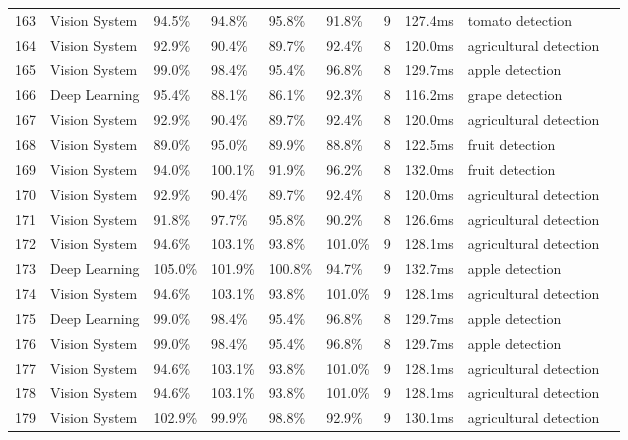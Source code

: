 \begin{table*}[htbp]
\begin{tabular}{p{}p{}p{}p{}p{}p{}p{}p{}p{}p{}}
 163 & Vision System & 94.5\% & 94.8\% & 95.8\% & 91.8\% & 9 & 127.4ms & tomato detection & \cite{jun2021towards} \\
 164 & Vision System & 92.9\% & 90.4\% & 89.7\% & 92.4\% & 8 & 120.0ms & agricultural detection & \cite{andujar2016using} \\
 165 & Vision System & 99.0\% & 98.4\% & 95.4\% & 96.8\% & 8 & 129.7ms & apple detection & \cite{hohimer2019design} \\
 166 & Deep Learning & 95.4\% & 88.1\% & 86.1\% & 92.3\% & 8 & 116.2ms & grape detection & \cite{pereira2019deep} \\
 167 & Vision System & 92.9\% & 90.4\% & 89.7\% & 92.4\% & 8 & 120.0ms & agricultural detection & \cite{bac2016analysis} \\
 168 & Vision System & 89.0\% & 95.0\% & 89.9\% & 88.8\% & 8 & 122.5ms & fruit detection & \cite{mehta2016robust} \\
 169 & Vision System & 94.0\% & 100.1\% & 91.9\% & 96.2\% & 8 & 132.0ms & fruit detection & \cite{williams2020improvements} \\
 170 & Vision System & 92.9\% & 90.4\% & 89.7\% & 92.4\% & 8 & 120.0ms & agricultural detection & \cite{lehnert2016sweet} \\
 171 & Vision System & 91.8\% & 97.7\% & 95.8\% & 90.2\% & 8 & 126.6ms & agricultural detection & \cite{ayaz2019internet} \\
 172 & Vision System & 94.6\% & 103.1\% & 93.8\% & 101.0\% & 9 & 128.1ms & agricultural detection & \cite{dutta2020cleaning} \\
 173 & Deep Learning & 105.0\% & 101.9\% & 100.8\% & 94.7\% & 9 & 132.7ms & apple detection & \cite{kang2020fast} \\
 174 & Vision System & 94.6\% & 103.1\% & 93.8\% & 101.0\% & 9 & 128.1ms & agricultural detection & \cite{khanal2020remote} \\
 175 & Deep Learning & 99.0\% & 98.4\% & 95.4\% & 96.8\% & 8 & 129.7ms & apple detection & \cite{gene2019multi} \\
 176 & Vision System & 99.0\% & 98.4\% & 95.4\% & 96.8\% & 8 & 129.7ms & apple detection & \cite{kang2019fruit} \\
 177 & Vision System & 94.6\% & 103.1\% & 93.8\% & 101.0\% & 9 & 128.1ms & agricultural detection & \cite{luo2020identifying} \\
 178 & Vision System & 94.6\% & 103.1\% & 93.8\% & 101.0\% & 9 & 128.1ms & agricultural detection & \cite{rayhana2020internet} \\
 179 & Vision System & 102.9\% & 99.9\% & 98.8\% & 92.9\% & 9 & 130.1ms & agricultural detection & \cite{pranto2021blockchain} \\

\end{tabular}
\end{table*}
